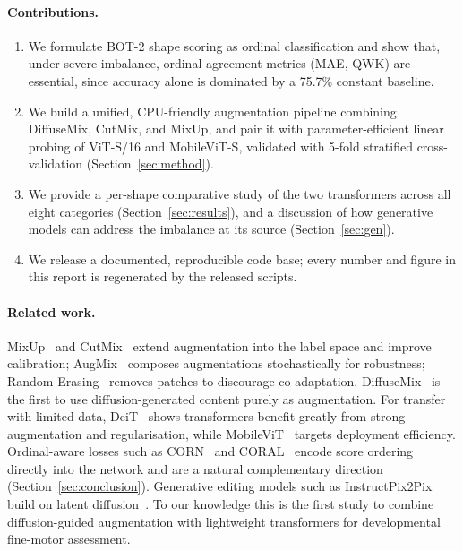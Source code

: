 \documentclass[10pt,twocolumn,letterpaper]{article}
\newcommand{\BaselineMeanAcc}{75.7}
\begin{document}
\paragraph{Contributions.}
\begin{enumerate}\itemsep2pt
  \item We formulate BOT-2 shape scoring as ordinal classification and show
        that, under severe imbalance, ordinal-agreement metrics (MAE, QWK) are
        essential, since accuracy alone is dominated by a \BaselineMeanAcc\%
        constant baseline.
  \item We build a unified, CPU-friendly augmentation pipeline combining
        DiffuseMix, CutMix, and MixUp, and pair it with parameter-efficient
        linear probing of ViT-S/16 and MobileViT-S, validated with 5-fold
        stratified cross-validation (Section~\ref{sec:method}).
  \item We provide a per-shape comparative study of the two transformers
        across all eight categories (Section~\ref{sec:results}), and a
        discussion of how generative models can address the imbalance at its
        source (Section~\ref{sec:gen}).
  \item We release a documented, reproducible code base; every number and
        figure in this report is regenerated by the released scripts.
\end{enumerate}

\paragraph{Related work.}
MixUp~\cite{mixup} and CutMix~\cite{cutmix} extend augmentation into the label
space and improve calibration; AugMix~\cite{augmix} composes augmentations
stochastically for robustness; Random Erasing~\cite{erasing} removes patches
to discourage co-adaptation. DiffuseMix~\cite{diffusemix} is the first to use
diffusion-generated content purely as augmentation. For transfer with limited
data, DeiT~\cite{deit} shows transformers benefit greatly from strong
augmentation and regularisation, while MobileViT~\cite{mobilevit} targets
deployment efficiency. Ordinal-aware losses such as CORN~\cite{corn} and
CORAL~\cite{coral} encode score ordering directly into the network and are a
natural complementary direction (Section~\ref{sec:conclusion}). Generative
editing models such as InstructPix2Pix~\cite{ip2p} build on latent
diffusion~\cite{stablediffusion}. To our knowledge this is the first study to
combine diffusion-guided augmentation with lightweight transformers for
developmental fine-motor assessment.
\end{document}
